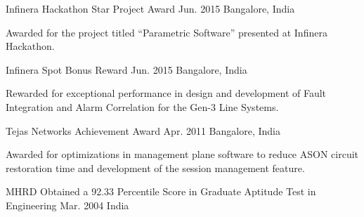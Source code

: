 \begin{cventries}
  \honorentry
    {Infinera} %
    {Hackathon Star Project Award} %
    {Jun. 2015} %
    {Bangalore, India}
    {
	\begin{cvitems2}
	  \item {Awarded for the project titled ``Parametric Software'' presented at Infinera Hackathon.} %
	\end{cvitems2}
    }

  \honorentry
    {Infinera} %
    {Spot Bonus Reward} %
    {Jun. 2015} %
    {Bangalore, India}
    {
	\begin{cvitems2}
	  \item {Rewarded for exceptional performance in design and development of Fault Integration and Alarm Correlation for the Gen-3 Line Systems.} %
	\end{cvitems2}
    }

  \honorentry
    {Tejas Networks} %
    {Achievement Award} %
    {Apr. 2011} %
    {Bangalore, India}
    {
	\begin{cvitems2}
	  \item {Awarded for optimizations in management plane software to reduce ASON circuit restoration time and development of the session management feature.} %
	\end{cvitems2}
    }

  \honorentry
    {MHRD} %
    {Obtained a 92.33 Percentile Score in Graduate Aptitude Test in Engineering} %
    {Mar. 2004} %
    {India}
    {}


\end{cventries}


